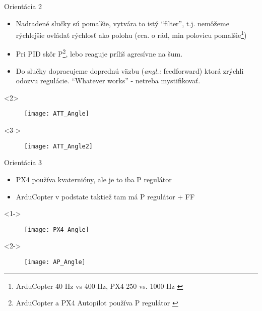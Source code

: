 \documentclass{beamer}
\newcommand{\angl}[1]{{\color{gray}(\emph{angl.:} #1)}}
\begin{document}
\begin{frame}[t]{Orientácia 2}
\begin{itemize}
  \item<1-> Nadradené slučky sú pomalšie, vytvára to istý ``filter'', t.j. nemôžeme rýchlejšie ovládať rýchlosť ako polohu (cca. o rád, min polovicu pomalšie\footnote{ArduCopter 40 Hz vs 400 Hz, PX4 250 vs. 1000 Hz \citep{AP:PID,PX4:PID}}) \citep{AP:PID,PX4:PID}
  \item<2-> Pri PID skôr P\footnote{ArduCopter a PX4 Autopilot používa P regulátor \citep{PX4:PID,AP:PIDDOC}}, lebo reaguje príliš agresívne na šum.
  \item<3-> Do slučky dopracujeme doprednú väzbu \angl{feedforward} ktorá zrýchli odozvu regulácie. ``Whatever works'' - netreba mystifikovať.
  \end{itemize}



  \begin{onlyenv}<2>
  \begin{figure}
\centering
  \texttt{[image: ATT\_Angle]}\\
\end{figure}
\end{onlyenv}

  \begin{onlyenv}<3->
\begin{figure}
\centering
  \texttt{[image: ATT\_Angle2]}\\
\end{figure}
\end{onlyenv}

  \end{frame}



  \begin{frame}[t]{Orientácia 3}
\begin{itemize}
  \item<1-> PX4 používa kvaternióny, ale je to iba P regulátor
  \item<2-> ArduCopter v podstate taktiež tam má P regulátor + FF
\end{itemize}

  \begin{onlyenv}<1->
  \begin{figure}
\centering
  \texttt{[image: PX4\_Angle]}\\
\end{figure}
\end{onlyenv}


  \begin{onlyenv}<2->
  \begin{figure}
\centering
  \texttt{[image: AP\_Angle]}\\
\end{figure}
\end{onlyenv}

  \end{frame}
\end{document}
